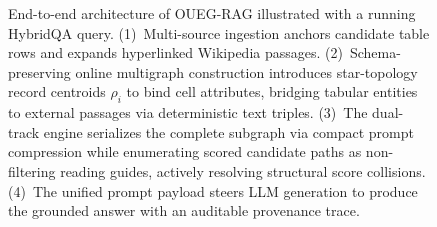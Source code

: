 \begin{figure}[t]
\centering
\resizebox{\linewidth}{!}{}
\vspace{-2mm}
\caption{End-to-end architecture of OUEG-RAG illustrated with a running HybridQA query. (1)~Multi-source ingestion anchors candidate table rows and expands hyperlinked Wikipedia passages. (2)~Schema-preserving online multigraph construction introduces star-topology record centroids $\rho_i$ to bind cell attributes, bridging tabular entities to external passages via deterministic text triples. (3)~The dual-track engine serializes the complete subgraph via compact prompt compression while enumerating scored candidate paths as non-filtering reading guides, actively resolving structural score collisions. (4)~The unified prompt payload steers LLM generation to produce the grounded answer with an auditable provenance trace.}
\vspace{-2mm}
\label{fig:pipeline}
\end{figure}
